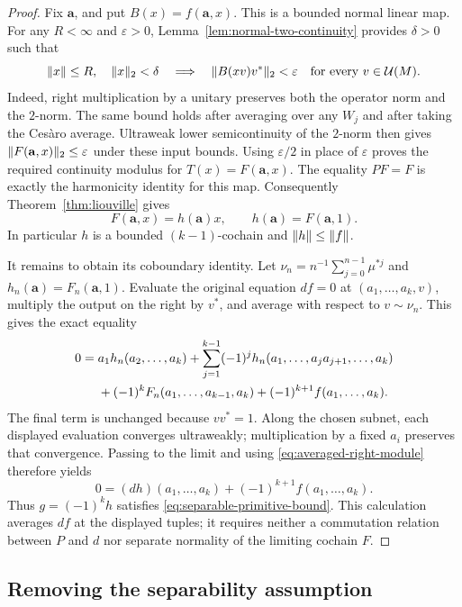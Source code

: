 \begin{proof}
Fix $\mathbf a$, and put $B(x)=f(\mathbf a,x)$.  This is a bounded
normal linear map.  For any $R<\infty$ and $\varepsilon>0$,
Lemma~\ref{lem:normal-two-continuity} provides $\delta>0$ such that
\[
 \lVert x\rVert\le R,\quad \lVert x\rVert_2<\delta
 \quad\Longrightarrow\quad
 \lVert B(xv)v^*\rVert_2<\varepsilon
 \quad\hbox{for every }v\in\mathcal U(M).
\]
Indeed, right multiplication by a unitary preserves both the operator
norm and the $2$-norm.  The same bound holds after averaging over any
$W_j$ and after taking the Ces\`aro average.  Ultraweak lower
semicontinuity of the $2$-norm then gives
$\lVert F(\mathbf a,x)\rVert_2\le\varepsilon$ under these input bounds.
Using $\varepsilon/2$ in place of $\varepsilon$ proves the required
continuity modulus for $T(x)=F(\mathbf a,x)$.  The equality $PF=F$
is exactly the harmonicity identity for this map.  Consequently
Theorem~\ref{thm:liouville} gives
\begin{equation}\label{eq:averaged-right-module}
 F(\mathbf a,x)=h(\mathbf a)x,
 \qquad h(\mathbf a)=F(\mathbf a,1).
\end{equation}
In particular $h$ is a bounded $(k-1)$-cochain and
$\lVert h\rVert\le\lVert f\rVert$.

It remains to obtain its coboundary identity.  Let
$\nu_n=n^{-1}\sum_{j=0}^{n-1}\mu^{*j}$ and
$h_n(\mathbf a)=F_n(\mathbf a,1)$.  Evaluate the original equation
$df=0$ at $(a_1,\ldots,a_k,v)$, multiply the output on the right by
$v^*$, and average with respect to $v\sim\nu_n$.  This gives the
exact equality
\begin{align}
 0={}&a_1h_n(a_2,\ldots,a_k)
 +\sum_{j=1}^{k-1}(-1)^j
 h_n(a_1,\ldots,a_ja_{j+1},\ldots,a_k)\notag\\
 &+(-1)^k F_n(a_1,\ldots,a_{k-1},a_k)
 +(-1)^{k+1}f(a_1,\ldots,a_k).
 \label{eq:original-cocycle-average}
\end{align}
The final term is unchanged because $vv^*=1$.  Along the chosen
subnet, each displayed evaluation converges ultraweakly; multiplication
by a fixed $a_i$ preserves that convergence.  Passing to the limit
and using \eqref{eq:averaged-right-module} therefore yields
\[
 0=(dh)(a_1,\ldots,a_k)+(-1)^{k+1}f(a_1,\ldots,a_k).
\]
Thus $g=(-1)^kh$ satisfies \eqref{eq:separable-primitive-bound}.
This calculation averages $df$ at the displayed tuples; it requires
neither a commutation relation between $P$ and $d$ nor separate
normality of the limiting cochain $F$.
\end{proof}

\subsection{Removing the separability assumption}

